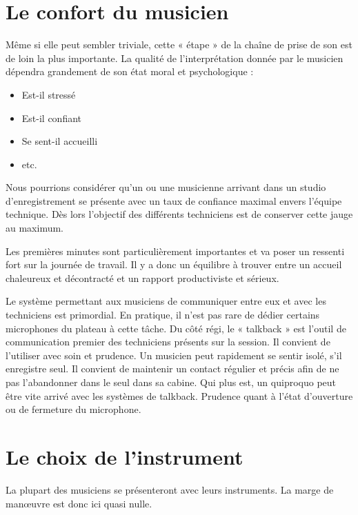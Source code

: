 \documentclass[
  letterpaper,
  DIV=11,
  numbers=noendperiod]{scrreprt}
\providecommand{\tightlist}{%
  \setlength{\itemsep}{0pt}\setlength{\parskip}{0pt}}\usepackage{longtable,booktabs,array}
\begin{document}
\hypertarget{le-confort-du-musicien}{%
\section{Le confort du musicien}\label{le-confort-du-musicien}}

Même si elle peut sembler triviale, cette « étape » de la chaîne de
prise de son est de loin la plus importante. La qualité de
l'interprétation donnée par le musicien dépendra grandement de son état
moral et psychologique :

\begin{itemize}
\tightlist
\item
  Est-il stressé
\item
  Est-il confiant
\item
  Se sent-il accueilli
\item
  etc.
\end{itemize}

Nous pourrions considérer qu'un ou une musicienne arrivant dans un
studio d'enregistrement se présente avec un taux de confiance maximal
envers l'équipe technique. Dès lors l'objectif des différents
techniciens est de conserver cette jauge au maximum.

Les premières minutes sont particulièrement importantes et va poser un
ressenti fort sur la journée de travail. Il y a donc un équilibre à
trouver entre un accueil chaleureux et décontracté et un rapport
productiviste et sérieux.

Le système permettant aux musiciens de communiquer entre eux et avec les
techniciens est primordial. En pratique, il n'est pas rare de dédier
certains microphones du plateau à cette tâche. Du côté régi, le «
talkback » est l'outil de communication premier des techniciens présents
sur la session. Il convient de l'utiliser avec soin et prudence. Un
musicien peut rapidement se sentir isolé, s'il enregistre seul. Il
convient de maintenir un contact régulier et précis afin de ne pas
l'abandonner dans le seul dans sa cabine. Qui plus est, un quiproquo
peut être vite arrivé avec les systèmes de talkback. Prudence quant à
l'état d'ouverture ou de fermeture du microphone.

\hypertarget{le-choix-de-linstrument}{%
\section{Le choix de l'instrument}\label{le-choix-de-linstrument}}

La plupart des musiciens se présenteront avec leurs instruments. La
marge de manœuvre est donc ici quasi nulle.
\end{document}
